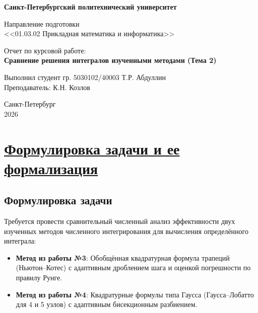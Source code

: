 \documentclass[14pt]{extarticle}
\begin{document}
	
	\thispagestyle{empty}
	
	\begin{center}
		
		\textbf{Санкт-Петербургский политехнический университет}\\
		\vspace{2cm}
		
		Направление подготовки \\
		\large <<01.03.02 Прикладная математика и информатика>>\\
		
		\vspace{6cm}
		
		Отчет по курсовой работе:\\
		\vspace{0.2cm}
		\textbf{\LARGE Сравнение решения интегралов изученными методами (Тема 2)}
		
		\vspace{5cm}
		
		\begin{flushleft}
			Выполнил студент гр. 5030102/40003 \hfill Т.Р. Абдуллин\\
			Преподаватель: \hfill К.Н. Козлов\\
		\end{flushleft}
		
		\vspace{3cm}
		
		Санкт-Петербург\\
		2026
	\end{center}
	
	
	\tableofcontents
	
	\newpage
	\section{\Large \underline{Формулировка задачи и ее формализация}}
	\subsection{Формулировка задачи}
	
	Требуется провести сравнительный численный анализ эффективности двух изученных методов численного интегрирования для вычисления определённого интеграла:
	\begin{itemize}
		\item \textbf{Метод из работы №3}: Обобщённая квадратурная формула трапеций (Ньютон–Котес) с адаптивным дроблением шага и оценкой погрешности по правилу Рунге.
		\item \textbf{Метод из работы №4}: Квадратурные формулы типа Гаусса (Гаусса–Лобатто для 4 и 5 узлов) с адаптивным бисекционным разбиением.
	\end{itemize}
	
\end{document}
